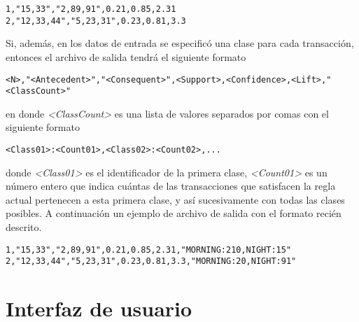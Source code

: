 \begin{lstlisting}[basicstyle=\ttfamily]
1,"15,33","2,89,91",0.21,0.85,2.31
2,"12,33,44","5,23,31",0.23,0.81,3.3
\end{lstlisting}

Si, además, en los datos de entrada se especificó una clase para cada transacción, entonces el archivo de salida tendrá el siguiente formato

\begin{lstlisting}[basicstyle=\ttfamily]
<N>,"<Antecedent>","<Consequent>",<Support>,<Confidence>,<Lift>,"<ClassCount>"
\end{lstlisting}

en donde \textit{<ClassCount>} es una lista de valores separados por comas con el siguiente formato

\begin{lstlisting}[basicstyle=\ttfamily]
<Class01>:<Count01>,<Class02>:<Count02>,...
\end{lstlisting}

donde \textit{<Class01>} es el identificador de la primera clase, \textit{<Count01>} es un número entero que indica cuántas de las transacciones que satisfacen la regla actual pertenecen a esta primera clase, y así sucesivamente con todas las clases posibles. A continuación un ejemplo de archivo de salida con el formato recién descrito.

\begin{lstlisting}[basicstyle=\ttfamily]
1,"15,33","2,89,91",0.21,0.85,2.31,"MORNING:210,NIGHT:15"
2,"12,33,44","5,23,31",0.23,0.81,3.3,"MORNING:20,NIGHT:91"
\end{lstlisting}


\section{Interfaz de usuario}



